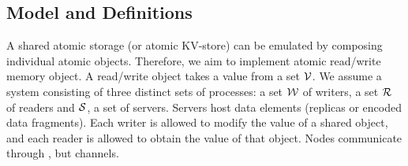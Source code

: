 \subsection{Model and Definitions}\label{model}

A shared atomic storage (or atomic KV-store) can be emulated
by composing individual atomic objects. Therefore, we aim
to implement  atomic read/write memory object. %
A read/write object takes a value from a set ${\mathcal V}$. 
We assume a system consisting of three distinct sets of processes: 
a set $\mathcal{W}$ of writers, a set $\mathcal{R}$ of readers and  $\mathcal{S}$, a set of servers. 
 Servers host data elements (replicas or encoded data fragments).
Each writer is allowed to modify the value of a shared object, and each reader is allowed to obtain 
the value of that object. 
Nodes communicate through 
, but  channels. 
%



%

